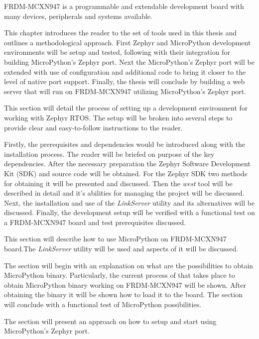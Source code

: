 \documentclass[twoside, 12pt]{article}
\begin{document}
FRDM-MCXN947 is a programmable and extendable development board with many devices, 
peripherals and systems available.

This chapter introduces the reader to the set of tools used in this thesis and outlines a 
methodological approach. First Zephyr and MicroPython development environments will be setup 
and tested, following with their integration for building MicroPython's Zephyr port. Next the
MicroPython's Zephyr port will be extended with use of configuration and additional code to 
bring it  closer to the level of native port support. Finally, the thesis will conclude by 
building a web server that will run on FRDM-MCXN947  utilizing MicroPython's Zephyr port.

This section will detail the process of setting up a development environment for working with
Zephyr RTOS. The setup will be broken into several steps to provide clear and easy-to-follow 
instructions to the reader.

Firstly, the prerequisites and dependencies would be introduced along with the installation 
process. The reader will be briefed on purpose of the key dependencies. After the 
necessary preparation the Zephyr Software Development Kit (SDK) and source code will be obtained. For the Zephyr SDK two methods for obtaining it
will be presented and discussed. Then the \textit{west} tool will be described in detail and
it's abilities for managing the project will be discussed. Next, the installation and use of 
the \textit{LinkServer} utility and its alternatives will be discussed. Finally, the 
development setup will be verified with a functional test on a FRDM-MCXN947 board and test 
prerequisites discussed.

This section will describe how to use MicroPython on FRDM-MCXN947 board.The 
\textit{LinkServer} utility will be used and aspects of it will be discussed.

The section will begin with an explanation on what are the possibilities to obtain 
MicroPython binary. Particularly, the current process of that takes place to obtain 
MicroPython binary working on FRDM-MCXN947 will be shown. After obtaining the binary it will 
be shown how to load it to the board. The section will conclude with a functional test of 
MicroPython possibilities.  

The section will present an approach on how to setup and start using MicroPython's Zephyr 
port.
\end{document}
